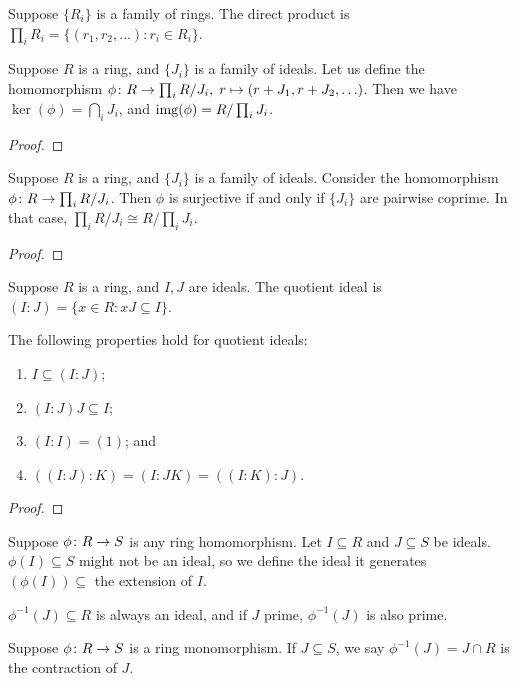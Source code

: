 \begin{definition}
    Suppose \(\{R_i\}\) is a family of rings.
    The direct product is \(\prod_i R_i = \{(r_1,r_2,\hdots) : r_i \in R_i\}\).
\end{definition}
\begin{lemma}
    Suppose \(R\) is a ring, and \(\{J_i\}\) is a family of ideals.
    Let us define the homomorphism \(\phi\colon R\to\prod_i R/J_i,\;r\mapsto(r+J_1,r+J_2,\hdots)\).
    Then we have \(\ker(\phi) = \bigcap_i J_i\),
    and \(\operatorname{img}(\phi) = R/\prod_i J_i\).
\end{lemma}
\begin{proof}
    
\end{proof}
\begin{theorem}
    Suppose \(R\) is a ring, and \(\{J_i\}\) is a family of ideals.
    Consider the homomorphism \(\phi\colon R\to\prod_i R/J_i\).
    Then \(\phi\) is surjective if and only if \(\{J_i\}\) are pairwise coprime.
    In that case, \(\prod_i R/J_i \cong R/\prod_i J_i\).
\end{theorem}
\begin{proof}
    
\end{proof}

\begin{definition}
    Suppose \(R\) is a ring, and \(I,J\) are ideals.
    The quotient ideal is \((I:J) = \{x \in R : xJ \subseteq I\}\).
\end{definition}
\begin{proposition}
    The following properties hold for quotient ideals:
    \begin{enumerate}[label={(\alph*)}, itemsep=0mm]
        \item \(I \subseteq (I:J)\);
        \item \((I:J)J \subseteq I\);
        \item \((I:I) = (1)\); and
        \item \(((I:J):K) = (I:JK) = ((I:K):J)\).
    \end{enumerate}
\end{proposition}
\begin{proof}
    
\end{proof}

\begin{definition}
    Suppose \(\phi\colon R\to S\) is any ring homomorphism.
    Let \(I \subseteq R\) and \(J \subseteq S\) be ideals.
    \(\phi(I) \subseteq S\) might not be an ideal,
    so we define the ideal it generates \((\phi(I)) \subseteq \) the extension of \(I\).
\end{definition}
\begin{remark}
    \(\phi^{-1}(J) \subseteq R\) is always an ideal,
    and if \(J\) prime, \(\phi^{-1}(J)\) is also prime.
\end{remark}
\begin{definition}
    Suppose \(\phi\colon R\to S\) is a ring monomorphism.
    If \(J \subseteq S\), we say \(\phi^{-1}(J) = J \cap R\) is the contraction of \(J\).
\end{definition}



